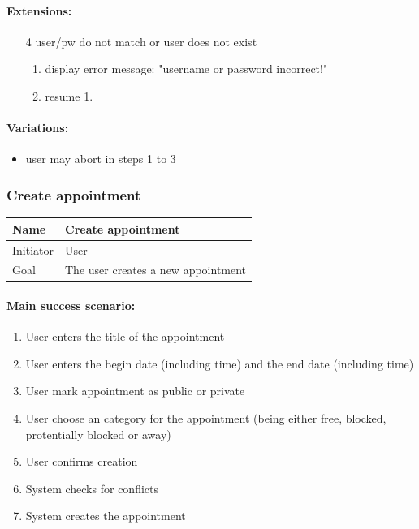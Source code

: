 \documentclass[a4paper]{scrartcl}
\begin{document}
\paragraph{Extensions:}
\begin{enumerate}
	\item[4] user/pw do not match or user does not exist
		\begin{enumerate}
			\item display error message: "username or password incorrect!"
			\item resume 1.
		\end{enumerate}
\end{enumerate}


\paragraph{Variations:}
\begin{itemize}
	\item	user may abort in steps 1 to 3
\end{itemize}

\subsubsection{Create appointment}

\begin{tabular}{|g|l|}
	\hline Name      & Create appointment                 \\ 
	\hline Initiator & User                               \\ 
	\hline Goal      & The user creates a new appointment \\ 
	\hline
\end{tabular}

\paragraph{Main success scenario:}
\begin{enumerate}
	\item User enters the title of the appointment
	\item User enters the begin date (including time) and the end date (including time)
	\item User mark appointment as public or private
	\item User choose an category for the appointment
		(being either free, blocked, protentially blocked or away)
	\item User confirms creation
	\item System checks for conflicts
	\item System creates the appointment
\end{enumerate}
\end{document}
